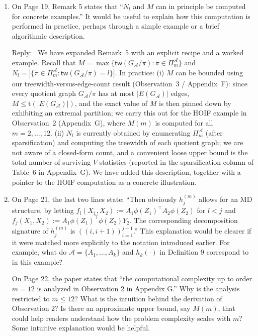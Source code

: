 \documentclass[12pt]{article}
\newenvironment{reply}{\par\smallskip\noindent\color{blue}Reply:\ \ignorespaces}{\par}
\newcommand{\calA}{\mathcal{A}}
\begin{document}
\begin{enumerate}
\item On Page 19, Remark 5 states that ``$N_l$ and $M$ can in principle be computed for concrete examples.'' It would be useful to explain how this computation is performed in practice, perhaps through a simple example or a brief algorithmic description.

\begin{reply}
We have expanded Remark~5 with an explicit recipe and a worked example. Recall that $M=\max\{\mathsf{tw}(G_{\calA}/\pi):\pi\in\Pi_m^{\calA}\}$ and $N_l=|\{\pi\in\Pi_m^{\calA}:\mathsf{tw}(G_{\calA}/\pi)=l\}|$. In practice: (i) $M$ can be bounded using our treewidth-versus-edge-count result (Observation~3 / Appendix~F): since every quotient graph $G_{\calA}/\pi$ has at most $|E(G_{\calA})|$ edges, $M\le \mathrm{t}(|E(G_{\calA})|)$, and the exact value of $M$ is then pinned down by exhibiting an extremal partition; we carry this out for the HOIF example in Observation~2 (Appendix~G), where $M(m)$ is computed for all $m=2,\dots,12$. (ii) $N_l$ is currently obtained by enumerating $\Pi_m^{\calA}$ (after sparsification) and computing the treewidth of each quotient graph; we are not aware of a closed-form count, and a convenient loose upper bound is the total number of surviving $V$-statistics (reported in the sparsification column of Table~6 in Appendix~G). We have added this description, together with a pointer to the HOIF computation as a concrete illustration.
\end{reply}

\item On Page 21, the last two lines state: ``Then obviously $h^{(m)}_j$ allows for an MD structure, by letting $f_l(X_1, X_2) := A_1\phi(Z_1)^{\top} A_2\phi(Z_2)$ for $l < j$ and $f_j(X_1, X_2) := A_1\phi(Z_1)^{\top} \phi(Z_2) Y_2$. The corresponding decomposition signature of $h^{(m)}_j$ is $((i, i+1))_{i=1}^{j-1}$.'' This explanation would be clearer if it were matched more explicitly to the notation introduced earlier. For example, what do $\mathcal{A} = \{A_1, \ldots, A_k\}$ and $h_k(\cdot)$ in Definition 9 correspond to in this example?

On Page 22, the paper states that ``the computational complexity up to order $m = 12$ is analyzed in Observation 2 in Appendix G.'' Why is the analysis restricted to $m \leq 12$? What is the intuition behind the derivation of Observation 2? Is there an approximate upper bound, say $M(m)$, that could help readers understand how the problem complexity scales with $m$? Some intuitive explanation would be helpful.


\end{enumerate}
\end{document}
